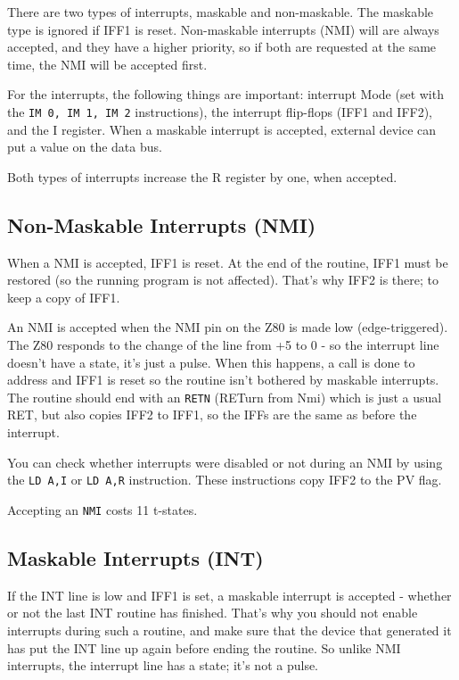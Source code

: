 \documentclass[12pt,twoside,openright,a4paper]{book}
\begin{document}
There are two types of interrupts, maskable and non-maskable. The maskable type is ignored if IFF1 is reset. Non-maskable interrupts (NMI) will are always accepted, and they have a higher priority, so if both are requested at the same time, the NMI will be accepted first.

For the interrupts, the following things are important: interrupt Mode (set with the {\tt IM 0, IM 1, IM 2} instructions), the interrupt flip-flops (IFF1 and IFF2), and the I register. When a maskable interrupt is accepted, external device can put a value on the data bus.

Both types of interrupts increase the R register by one, when accepted.


\subsection{Non-Maskable Interrupts (NMI)}

When a NMI is accepted, IFF1 is reset. At the end of the routine, IFF1 must be restored (so the running program is not affected). That's why IFF2 is there; to keep a copy of IFF1.

An NMI is accepted when the NMI pin on the Z80 is made low (edge-triggered). The Z80 responds to the change of the line from +5 to 0 - so the interrupt line doesn't have a state, it's just a pulse. When this happens, a call is done to address  and IFF1 is reset so the routine isn't bothered by maskable interrupts. The routine should end with an {\tt RETN} (RETurn from Nmi) which is just a usual RET, but also copies IFF2 to IFF1, so the IFFs are the same as before the interrupt.

You can check whether interrupts were disabled or not during an NMI by using the {\tt LD A,I} or {\tt LD A,R} instruction. These instructions copy IFF2 to the PV flag.

Accepting an {\tt NMI} costs 11 t-states.


\subsection{Maskable Interrupts (INT)}

If the INT line is low and IFF1 is set, a maskable interrupt is accepted - whether or not the last INT routine has finished. That's why you should not enable interrupts during such a routine, and make sure that the device that generated it has put the INT line up again before ending the routine. So unlike NMI interrupts, the interrupt line has a state; it's not a pulse.
\end{document}
